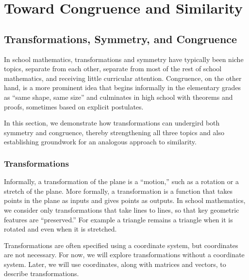 
\chapter{Toward Congruence and Similarity}  


\section{Transformations, Symmetry, and Congruence}
In school mathematics, transformations and symmetry have typically been niche topics, separate from each other, separate from most of the rest of school mathematics, and receiving little curricular attention.  Congruence, on the other hand, is a more prominent idea that begins informally in the elementary grades as ``same shape, same size'' and culminates in high school with theorems and proofs, sometimes based on explicit postulates.  

In this section, we demonstrate how transformations can undergird both symmetry and congruence, thereby strengthening all three topics and also establishing groundwork for an analogous approach to similarity.  

\subsection{Transformations}
Informally, a transformation of the plane is a ``motion,'' such as a rotation or a stretch of the plane.  More formally, a transformation is a function that takes points in the plane as inputs and gives points as outputs.  In school mathematics, we consider only transformations that take lines to lines, so that key geometric features are ``preserved.''  For example a triangle remains a triangle when it is rotated and even when it is stretched.  

Transformations are often specified using a coordinate system, but coordinates are not necessary.  For now, we will explore transformations without a coordinate system.  Later, we will use coordinates, along with matrices and vectors, to describe transformations.  

